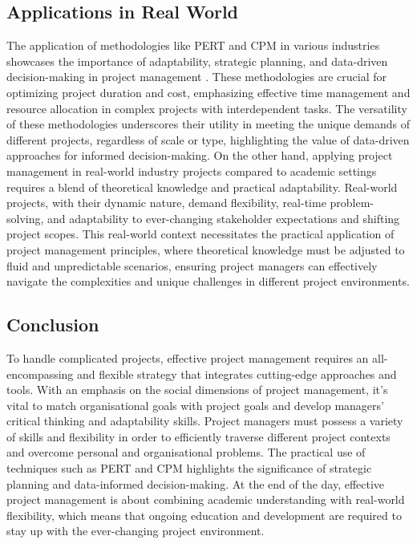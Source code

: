 \documentclass{article}
\begin{document}
\subsection{Applications in Real World}
The application of methodologies like PERT and CPM in various industries showcases the importance of adaptability, strategic planning, and data-driven decision-making in project management \cite{cicmil2006rethinking}. These methodologies are crucial for optimizing project duration and cost, emphasizing effective time management and resource allocation in complex projects with interdependent tasks. The versatility of these methodologies underscores their utility in meeting the unique demands of different projects, regardless of scale or type, highlighting the value of data-driven approaches for informed decision-making. On the other hand, applying project management in real-world industry projects compared to academic settings requires a blend of theoretical knowledge and practical adaptability. Real-world projects, with their dynamic nature, demand flexibility, real-time problem-solving, and adaptability to ever-changing stakeholder expectations and shifting project scopes. This real-world context necessitates the practical application of project management principles, where theoretical knowledge must be adjusted to fluid and unpredictable scenarios, ensuring project managers can effectively navigate the complexities and unique challenges in different project environments.

\subsection{Conclusion}

To handle complicated projects, effective project management requires an all-encompassing and flexible strategy that integrates cutting-edge approaches and tools. With an emphasis on the social dimensions of project management, it's vital to match organisational goals with project goals and develop managers' critical thinking and adaptability skills. Project managers must possess a variety of skills and flexibility in order to efficiently traverse different project contexts and overcome personal and organisational problems. The practical use of techniques such as PERT and CPM highlights the significance of strategic planning and data-informed decision-making. At the end of the day, effective project management is about combining academic understanding with real-world flexibility, which means that ongoing education and development are required to stay up with the ever-changing project environment.









\end{document}

